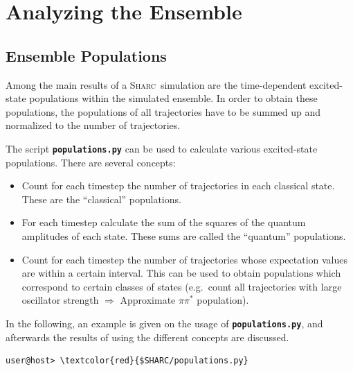 \documentclass[a4paper,11pt,DIV=15,openany]{scrbook}
\newcommand{\sharc}{\textsc{Sharc}}
\newcommand{\ttt}[1]{\textbf{\texttt{#1}}}
\begin{document}
\clearpage
\section{Analyzing the Ensemble}

\subsection{Ensemble Populations}

Among the main results of a \sharc\ simulation are the time-dependent excited-state populations within the simulated ensemble. In order to obtain these populations, the populations of all trajectories have to be summed up and normalized to the number of trajectories.

The script \ttt{populations.py} can be used to calculate various excited-state populations. There are several concepts:
\begin{itemize}
  \item Count for each timestep the number of trajectories in each classical state. These are the ``classical'' populations.
  \item For each timestep calculate the sum of the squares of the quantum amplitudes of each state. These sums are called the ``quantum'' populations.
  \item Count for each timestep the number of trajectories whose expectation values are within a certain interval. This can be used to obtain populations which correspond to certain classes of states (e.g.\ count all trajectories with large oscillator strength $\Rightarrow$ Approximate $\pi\pi^*$ population).
\end{itemize}

In the following, an example is given on the usage of \ttt{populations.py}, and afterwards the results of using the different concepts are discussed.

\begin{Verbatim}[commandchars=\\\{\}]
user@host> \textcolor{red}{$SHARC/populations.py}
\end{Verbatim}
\end{document}
